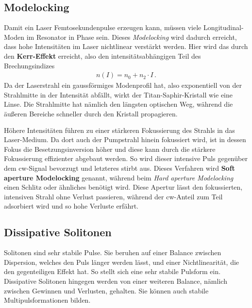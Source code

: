 \documentclass[bachelor,       %
               twoside,        %
               BCOR10mm,       %
               liststotoc,nomtotoc,bibtotoc, %
               english,ngerman, %
               final,          %
               ]{GAUBM}
\begin{document}
\subsection{Modelocking}
Damit ein Laser Femtosekundenpulse erzeugen kann, müssen viele Longitudinal-Moden im Resonator in Phase sein.
Dieses \emph{Modelocking} wird dadurch erreicht, dass hohe Intensitäten im Laser nichtlinear verstärkt werden.
Hier wird das durch den \textbf{Kerr-Effekt} erreicht, also den intensitätsabhängigen Teil des Brechungsindizes
\begin{align}
	n(I)=n_0+n_2\cdot I\,.
	\label{eq:kerr}
\end{align}
Da der Laserstrahl ein gaussförmiges Modenprofil hat, also exponentiell von der Strahlmitte in der Intensität abfällt, wirkt der Titan-Saphir-Kristall wie eine Linse.
Die Strahlmitte hat nämlich den längsten optischen Weg, während die äußeren Bereiche schneller durch den Kristall propagieren.

Höhere Intensitäten führen zu einer stärkeren Fokussierung des Strahls in das Laser-Medium.
Da dort auch der Pumpstrahl hinein fokussiert wird, ist in dessen Fokus die Besetzungsinversion höher und diese kann durch die stärkere Fokussierung effizienter abgebaut werden.
So wird dieser intensive Puls gegenüber dem cw-Signal bevorzugt und letzteres stirbt aus.
Dieses Verfahren wird \textbf{Soft aperture Modelocking} genannt, während beim \textit{Hard aperture Modelocking} einen Schlitz oder ähnliches benötigt wird.
Diese Apertur lässt den fokussierten, intensiven Strahl ohne Verlust passieren, während der cw-Anteil zum Teil adsorbiert wird und so hohe Verluste erfährt.

\subsection{Dissipative Solitonen}
Solitonen sind sehr stabile Pulse.
Sie beruhen auf einer Balance zwischen Dispersion, welches den Puls länger werden lässt, und einer Nichtlinearität, die den gegenteiligen Effekt hat.
So stellt sich eine sehr stabile Pulsform ein.
Dissipative Solitonen hingegen werden von einer weiteren Balance, nämlich zwischen Gewinnen und Verlusten, gehalten.
Sie können auch stabile Multipulsformationen bilden.
\end{document}
